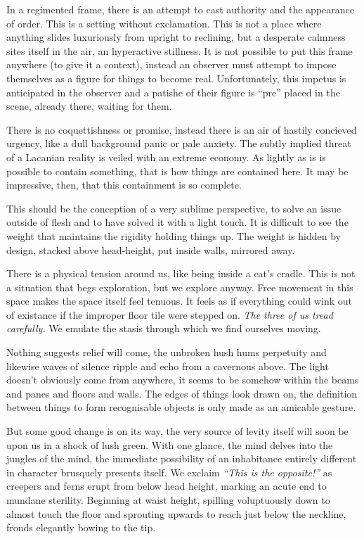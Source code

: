 \documentclass{book}
\begin{document}
In a regimented frame, there is an attempt to cast authority and the appearance
of order. This is a setting without exclamation. This is not a place where
anything slides luxuriously from upright to reclining, but a desperate calmness
sites itself in the air, an hyperactive stillness. It is not possible to put
this frame anywhere (to give it a context), instead an observer must attempt to
impose themselves as a figure for things to become real. Unfortunately, this
impetus is anticipated in the observer and a patishe of their figure is ``pre''
placed in the scene, already there, waiting for them.

There is no coquettishness or promise, instead there is an air of hastily
concieved urgency, like a dull background panic or pale anxiety. The subtly
implied threat of a Lacanian reality is veiled with an extreme economy. As
lightly as is is possible to contain something, that is how things are
contained here. It may be impressive, then, that this containment is so
complete.

This should be the conception of a very sublime perspective, to solve an issue
outside of flesh and to have solved it with a light touch. It is difficult to
see the weight that maintains the rigidity holding things up. The weight is
hidden by design, stacked above head-height, put inside walls, mirrored away.

There is a physical tension around us, like being inside a cat's cradle. This
is not a situation that begs exploration, but we explore anyway. Free movement
in this space makes the space itself feel tenuous. It feels as if everything
could wink out of existance if the improper floor tile were stepped on.
\emph{The three of us tread carefully.} We emulate the stasis through which we
find ourselves moving.

Nothing suggests relief will come, the unbroken hush hums perpetuity and
likewise waves of silence ripple and echo from a cavernous above. The light
doesn't obviously come from anywhere, it seems to be somehow within the beams
and panes and floors and walls. The edges of things look drawn on, the
definition between things to form recognisable objects is only made as an
amicable gesture.

But some good change is on its way, the very source of levity itself will soon
be upon us in a shock of lush green. With one glance, the mind delves into the
jungles of the mind, the immediate possibility of an inhabitance entirely
different in character brusquely presents itself. We exclaim \emph{``This is
the opposite!''} as creepers and ferns erupt from below head height, marking an
acute end to mundane sterility. Beginning at waist height, spilling
voluptuously down to almost touch the floor and sprouting upwards to reach just
below the neckline, fronds elegantly bowing to the tip.
\end{document}
